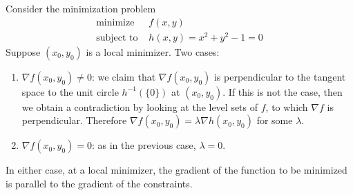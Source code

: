 \documentclass[11pt]{article}
\begin{document}
Consider the minimization problem
\begin{align*}
\text{minimize } &f(x,y) \\
\text{subject to } &h(x,y) = x^2 + y^2 - 1 = 0
\end{align*}
Suppose $(x_0, y_0)$ is a local minimizer. Two cases:
\begin{enumerate}
\item $\nabla f(x_0, y_0) \neq 0$: we claim that $\nabla f(x_0, y_0)$ is perpendicular to the tangent space to the unit circle $h^{-1}(\{0\})$ at $(x_0, y_0)$. If this is not the case, then we obtain a contradiction by looking at the level sets of $f$, to which $\nabla f$ is perpendicular. Therefore $\nabla f(x_0, y_0) = \lambda \nabla h(x_0, y_0)$ for some $\lambda$.

\item $\nabla f(x_0, y_0) = 0$: as in the previous case, $\lambda = 0$.
\end{enumerate}
In either case, at a local minimizer, the gradient of the function to be minimized is parallel to the gradient of the constraints.
\end{document}
